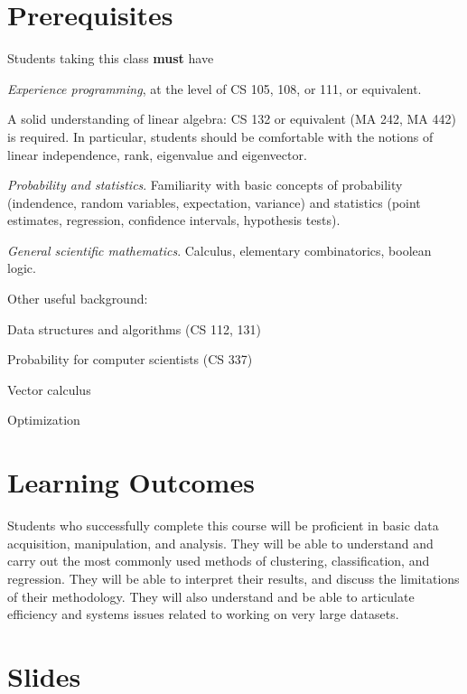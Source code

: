 \documentclass[11pt]{article}
\begin{document}
\section*{Prerequisites} 
Students taking this class \textbf{must} have 
\begin{compactitem}
  \item \emph{Experience programming}, at the level of CS 105, 108, or 111, or
  equivalent.  
\item A solid understanding of linear algebra: CS 132 or equivalent (MA 242, MA 442) is
required. In particular, students should be comfortable with the notions
  of linear independence, rank,
  eigenvalue and eigenvector.
\item \emph{Probability and statistics}. Familiarity
  with basic concepts of probability (indendence, random variables, expectation,
  variance) and statistics (point estimates, regression, confidence intervals,
  hypothesis tests).
\item \emph{General scientific mathematics}. Calculus, elementary
  combinatorics, boolean logic.

\end{compactitem}
\noindent Other useful background:
\begin{compactitem}
\item Data structures and algorithms (CS 112, 131)
\item Probability for computer scientists (CS 337)
\item Vector calculus
\item Optimization
\end{compactitem}

\section*{Learning Outcomes}

Students who successfully complete this course will be proficient in
basic data acquisition, manipulation, and analysis.  They will be able
to understand and carry out the most commonly used methods of clustering,
classification, and regression. They will be able to interpret their
results, and discuss the limitations of their methodology. 
   They will also understand and be able to articulate 
efficiency and systems issues related to working on very large
datasets. 

\section*{Slides} 
\end{document}
